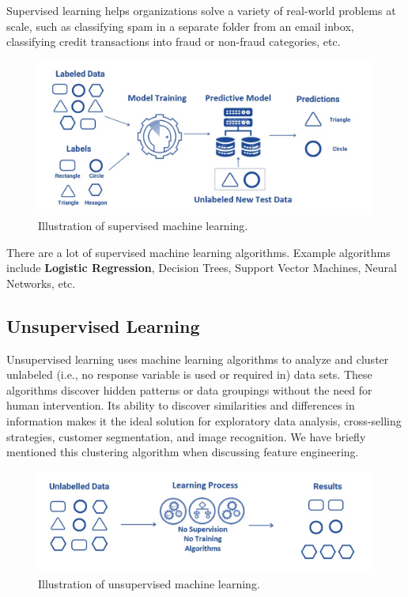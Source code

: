 \documentclass[
]{book}
\begin{document}
Supervised learning helps organizations solve a variety of real-world problems at scale, such as classifying spam in a separate folder from an email inbox, classifying credit transactions into fraud or non-fraud categories, etc.

\begin{figure}

{\centering \includegraphics[width=16in,height=0.3\textheight]{img07/w07-superised} 

}

\caption{ Illustration of supervised machine learning.}\label{fig:unnamed-chunk-136}
\end{figure}

There are a lot of supervised machine learning algorithms. Example algorithms include \textbf{Logistic Regression}, Decision Trees, Support Vector Machines, Neural Networks, etc.

\hypertarget{unsupervised-learning}{%
\subsection{Unsupervised Learning}\label{unsupervised-learning}}

Unsupervised learning uses machine learning algorithms to analyze and cluster unlabeled (i.e., no response variable is used or required in) data sets. These algorithms discover hidden patterns or data groupings without the need for human intervention. Its ability to discover similarities and differences in information makes it the ideal solution for exploratory data analysis, cross-selling strategies, customer segmentation, and image recognition. We have briefly mentioned this clustering algorithm when discussing feature engineering.

\begin{figure}

{\centering \includegraphics[width=0.8\linewidth]{img07/w07-unsuperised} 

}

\caption{Illustration of unsupervised machine learning.}\label{fig:unnamed-chunk-137}
\end{figure}
\end{document}
